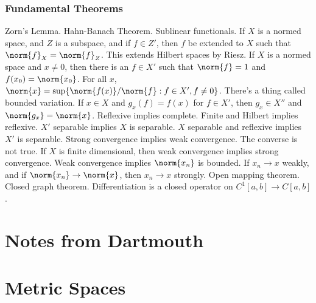 \documentclass[crop=false,class=book,oneside]{standalone}                      %
\begin{document}
            \subsubsection{Fundamental Theorems}
                Zorn's Lemma. Hahn-Banach Theorem. Sublinear functionals.
                If $X$ is a normed space, and $Z$ is a subspace, and if
                $f\in{Z'}$, then $f$ be extended to $X$ such that
                $\norm{f}_{X}=\norm{f}_{Z}$.
                This extends Hilbert spaces by Riesz.
                If $X$ is a normed space
                and $x\ne{0}$, then there is an $f\in{X'}$ such that
                $\norm{f}=1$ and $f(x_{0})=\norm{x_{0}}$.
                For all $x$,
                $\norm{x}=\sup\{\norm{f(x)}/\norm{f}:f\in{X'},f\ne{0}\}$.
                There's a thing called bounded variation.
                If $x\in{X}$ and
                $g_{x}(f)=f(x)$ for $f\in{X'}$, then
                $g_{x}\in{X''}$ and $\norm{g_{x}}=\norm{x}$.
                Reflexive implies complete.
                Finite and Hilbert implies reflexive.
                $X'$ separable implies $X$ is separable.
                $X$ separable and reflexive implies
                $X'$ is separable.
                Strong convergence implies weak convergence.
                The converse is not true. If $X$ is finite
                dimensional, then weak convergence
                implies strong convergence. Weak convergence implies
                $\norm{x_{n}}$ is bounded. If
                $x_{n}\rightarrow{x}$ weakly, and if
                $\norm{x_{n}}\rightarrow\norm{x}$, then
                $x_{n}\rightarrow{x}$ strongly.
                Open mapping theorem.
                Closed graph theorem.
                Differentiation is a closed operator on
                $C^{1}[a,b]\rightarrow{C[a,b]}$.
    \section{Notes from Dartmouth}
    \section{Metric Spaces}
\end{document}

